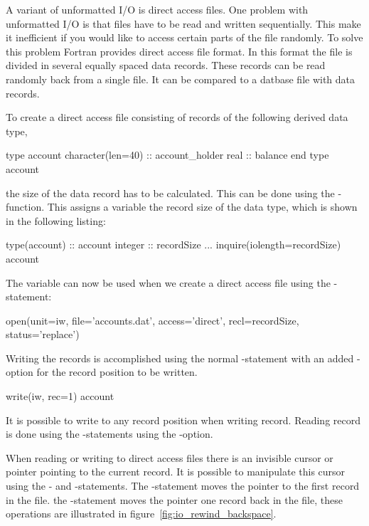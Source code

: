 A variant of unformatted I/O is direct access files. One problem with unformatted I/O is that files have to be read and written sequentially. This make it inefficient if you would like to access certain parts of the file randomly. To solve this problem Fortran provides direct access file format. In this format the file is divided in several equally spaced data records. These records can be read randomly back from a single file. It can be compared to a datbase file with data records.

To create a direct access file consisting of records of the following derived data type,

\fmode

\begin{fortrancodeenv}
type account
    character(len=40) :: account_holder
	real :: balance
end type account
\end{fortrancodeenv}

the size of the data record has to be calculated. This can be done using the -function. This assigns a variable the record size of the data type, which is shown in the following listing:

\begin{fortrancodeenv}
type(account) :: account
integer :: recordSize
...	
inquire(iolength=recordSize) account
\end{fortrancodeenv}

The  variable can now be used when we create a direct access file using the -statement:

\begin{fortrancodeenv}
open(unit=iw, file='accounts.dat', access='direct', recl=recordSize, status='replace')
\end{fortrancodeenv}

Writing the records is accomplished using the normal -statement with an added -option for the record position to be written.

\begin{fortrancodeenv}
write(iw, rec=1) account
\end{fortrancodeenv}

It is possible to write to any record position when writing record. Reading record is done using the -statements using the -option.

When reading or writing to direct access files there is an invisible cursor or pointer pointing to the current record. It is possible to manipulate this cursor using the - and -statements. The -statement moves the pointer to the first record in the file. the -statement moves the pointer one record back in the file, these operations are illustrated in figure~\ref{fig:io_rewind_backspace}.

